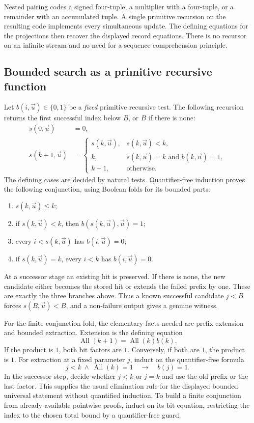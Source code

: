 Nested pairing codes a signed four-tuple, a multiplier with a four-tuple,
or a remainder with an accumulated tuple. A single primitive recursion
on the resulting code implements every simultaneous update. The defining
equations for the projections then recover the displayed record equations.
There is no recursor on an infinite stream and no need for a sequence
comprehension principle.

\subsection{Bounded search as a primitive recursive function}
\label{app:folds}

Let $b(i,\vec u)\in\{0,1\}$ be a \emph{fixed} primitive recursive test.
The following recursion returns the first successful index below $B$,
or $B$ if there is none:
\begin{align*}
 s(0,\vec u)&=0,\\
 s(k+1,\vec u)&=
 \begin{cases}
 s(k,\vec u),&s(k,\vec u)<k,\\
 k,&s(k,\vec u)=k\text{ and }b(k,\vec u)=1,\\
 k+1,&\text{otherwise}.
 \end{cases}
\end{align*}
The defining cases are decided by natural tests. Quantifier-free induction
proves the following conjunction, using Boolean folds for its bounded parts:
\begin{enumerate}
\item $s(k,\vec u)\le k$;
\item if $s(k,\vec u)<k$, then $b(s(k,\vec u),\vec u)=1$;
\item every $i<s(k,\vec u)$ has $b(i,\vec u)=0$;
\item if $s(k,\vec u)=k$, every $i<k$ has $b(i,\vec u)=0$.
\end{enumerate}
At a successor stage an existing hit is preserved. If there is none,
the new candidate either becomes the stored hit or extends the failed
prefix by one. These are exactly the three branches above. Thus a known
successful candidate $j<B$ forces $s(B,\vec u)<B$, and a non-failure
output gives a genuine witness.

For the finite conjunction fold, the elementary facts needed are prefix
extension and bounded extraction. Extension is the defining equation
\[
 \operatorname{All}(k+1)=\operatorname{All}(k)b(k).
\]
If the product is $1$, both bit factors are $1$. Conversely, if both are
$1$, the product is $1$. For extraction at a fixed parameter $j$, induct
on the quantifier-free formula
\[
 j<k\ \land\ \operatorname{All}(k)=1\quad\to\quad b(j)=1.
\]
In the successor step, decide whether $j<k$ or $j=k$ and use the old
prefix or the last factor. This supplies the usual elimination rule for
the displayed bounded universal statement without quantified induction.
To build a finite conjunction from already available pointwise proofs,
induct on its bit equation, restricting the index to the chosen total
bound by a quantifier-free guard.

